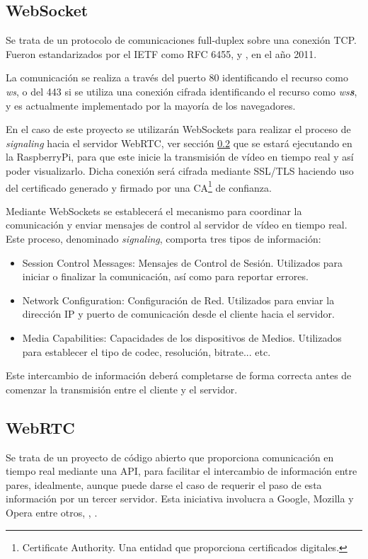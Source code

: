 \subsection{WebSocket}
\label{subsec:WebSocket}
Se trata de un protocolo de comunicaciones full-duplex sobre una conexión TCP. Fueron estandarizados por el IETF como RFC 6455, \citep{wiki:WebSocket6455} y \citep{wiki:WebSocketWiki}, en el año 2011.  

La comunicación se realiza a través del puerto 80 identificando el recurso como \textit{ws}, o del 443 si se utiliza una conexión cifrada  identificando el recurso como \textit{ws\textbf{s}}, y es actualmente implementado por la mayoría de los navegadores. 

En el caso de este proyecto se utilizarán WebSockets para realizar el proceso de \textit{signaling} hacia el servidor WebRTC, ver sección \ref{subsec:WebRTC} que se estará ejecutando en la RaspberryPi, para que este inicie la transmisión de vídeo en tiempo real y así poder visualizarlo. Dicha conexión será cifrada mediante SSL/TLS haciendo uso del certificado generado y firmado por una CA\footnote{Certificate Authority. Una entidad que proporciona certificados digitales.} de confianza.

Mediante WebSockets se establecerá el mecanismo para coordinar la comunicación y enviar mensajes de control al servidor de vídeo en tiempo real. Este proceso, denominado \textit{signaling}, comporta tres tipos de información:
\begin{itemize}
\item Session Control Messages: Mensajes de Control de Sesión. Utilizados para iniciar o finalizar la comunicación, así como para reportar errores.
\item Network Configuration: Configuración de Red. Utilizados para enviar la dirección IP y puerto de comunicación desde el cliente hacia el servidor.
\item Media Capabilities: Capacidades de los dispositivos de Medios. Utilizados para establecer el tipo de codec, resolución, bitrate... etc.
\end{itemize}

Este intercambio de información deberá completarse de forma correcta antes de comenzar la transmisión entre el cliente y el servidor. 


\subsection{WebRTC}
\label{subsec:WebRTC}
Se trata de un proyecto de código abierto que proporciona comunicación en tiempo real mediante una API, para facilitar el intercambio de información entre pares, idealmente, aunque puede darse el caso de requerir el paso de esta información por un tercer servidor. Esta iniciativa involucra a Google, Mozilla y Opera entre otros, \citep{wiki:WebRTCorg}, \citep{wiki:WebRTCmdn}.

